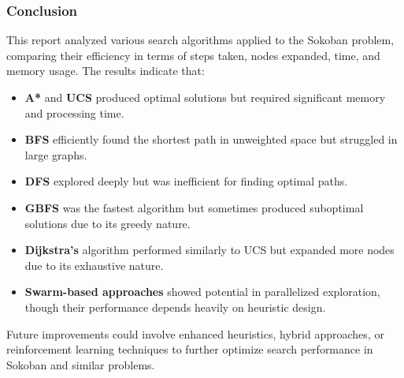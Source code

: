 \subsubsection{Conclusion}
\noindent This report analyzed various search algorithms applied to the Sokoban problem, comparing their efficiency in terms of steps taken, nodes expanded, time, and memory usage. The results indicate that:
\begin{itemize}
    \item \textbf{A*} and \textbf{UCS} produced optimal solutions but required significant memory and processing time.
    \item \textbf{BFS} efficiently found the shortest path in unweighted space but struggled in large graphs.
    \item \textbf{DFS} explored deeply but was inefficient for finding optimal paths.
    \item \textbf{GBFS} was the fastest algorithm but sometimes produced suboptimal solutions due to its greedy nature.
    \item \textbf{Dijkstra’s} algorithm performed similarly to UCS but expanded more nodes due to its exhaustive nature.
    \item \textbf{Swarm-based approaches} showed potential in parallelized exploration, though their performance depends heavily on heuristic design.
\end{itemize}
Future improvements could involve enhanced heuristics, hybrid approaches, or reinforcement learning techniques to further optimize search performance in Sokoban and similar problems.
